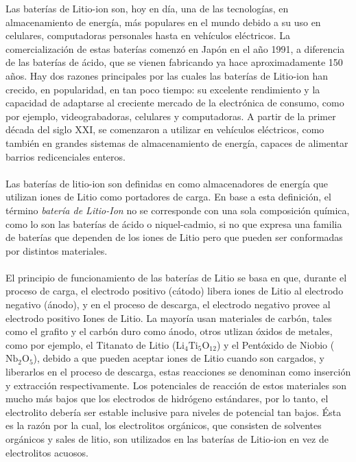 \documentclass[10pt,a4paper]{article}
\begin{document}
	\noindent Las baterías de Litio-ion son, hoy en día, una de las tecnologías, en almacenamiento de energía, más populares en el mundo debido a su uso en celulares, computadoras personales hasta en vehículos eléctricos. La comercialización de estas baterías comenzó en Japón en el año 1991, a diferencia de las baterías de ácido, que se vienen fabricando ya hace aproximadamente 150 años. Hay dos razones principales por las cuales las baterías de Litio-ion han crecido, en popularidad, en tan poco tiempo: su excelente rendimiento y la capacidad de adaptarse al creciente mercado de la electrónica de consumo, como por ejemplo, videograbadoras, celulares y computadoras. A partir de la primer década del siglo XXI, se comenzaron a utilizar en vehículos eléctricos, como también en grandes sistemas de almacenamiento de energía, capaces de alimentar barrios redicenciales enteros.\\
	\\
	\noindent Las baterías de litio-ion son definidas en \cite{def_liion} como almacenadores de energía que utilizan iones de Litio como portadores de carga. En base a esta definición, el término \emph{batería de Litio-Ion} no se corresponde con una sola composición química, como lo son las baterías de ácido o niquel-cadmio, si no que expresa una familia de baterías que dependen de los iones de Litio pero que pueden ser conformadas por distintos materiales.\\
	\\
	\noindent El principio de funcionamiento de las baterías de Litio se basa en que, durante el proceso de carga, el electrodo positivo (cátodo) libera iones de Litio al electrodo negativo (ánodo), y  en el proceso de descarga, el electrodo negativo provee al electrodo positivo Iones de Litio. La mayoría usan materiales de carbón, tales como el grafito y el carbón duro como ánodo, otros utlizan óxidos de metales, como por ejemplo, el Titanato de Litio ($\mathrm{Li_4Ti_5O_{12}}$) y el Pentóxido de Niobio ($\mathrm{Nb_2O_5}$), debido a que pueden aceptar iones de Litio cuando son cargados, y liberarlos en el proceso de descarga, estas reacciones se denominan como inserción y extracción respectivamente. Los potenciales de reacción de estos materiales son mucho más bajos que los electrodos de hidrógeno estándares, por lo tanto, el electrolito debería ser estable inclusive para niveles de potencial tan bajos. Ésta es la razón por la cual, los electrolitos orgánicos, que consisten de solventes orgánicos y sales de litio, son utilizados en las baterías de Litio-ion en vez de electrolitos acuosos.\\
\end{document}
